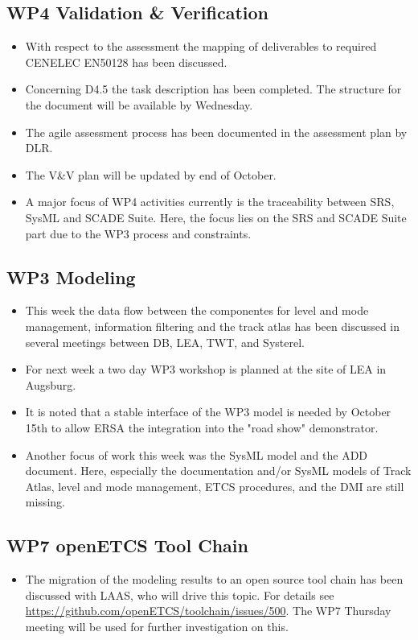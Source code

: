 \documentclass[a4paper, 11pt]{article}
\begin{document}
\subsection{WP4 Validation \& Verification}
\begin{itemize}
\item With respect to the assessment the mapping of deliverables to required CENELEC EN50128 has been discussed.
\item Concerning D4.5 the task description has been completed. The structure for the document will be available by Wednesday.
\item The agile assessment process has been documented in the assessment plan by DLR.
\item The V\&V plan will be updated by end of October.
\item A major focus of WP4 activities currently is the traceability between SRS, SysML and SCADE Suite. Here, the focus lies on the SRS and SCADE Suite part due to the WP3 process and constraints.
\end{itemize}

\subsection{WP3 Modeling}
\begin{itemize}
\item This week the data flow between the componentes for level and mode management, information filtering and the track atlas has been discussed in several meetings between DB, LEA, TWT, and Systerel.
\item For next week a two day WP3 workshop is planned at the site of LEA in Augsburg.
\item It is noted that a stable interface of the WP3 model is needed by October 15th to allow ERSA the integration into the "road show" demonstrator.
\item Another focus of work this week was the SysML model and the ADD document. Here, especially the documentation and/or SysML models of Track Atlas, level and mode management, ETCS procedures, and the DMI are still missing.
\end{itemize}

\subsection{WP7 openETCS Tool Chain}
\begin{itemize}
\item The migration of the modeling results to an open source tool chain has been discussed with LAAS, who will drive this topic. For details see \url{https://github.com/openETCS/toolchain/issues/500}. The WP7 Thursday meeting will be used for further investigation on this.
\end{itemize}
\end{document}
